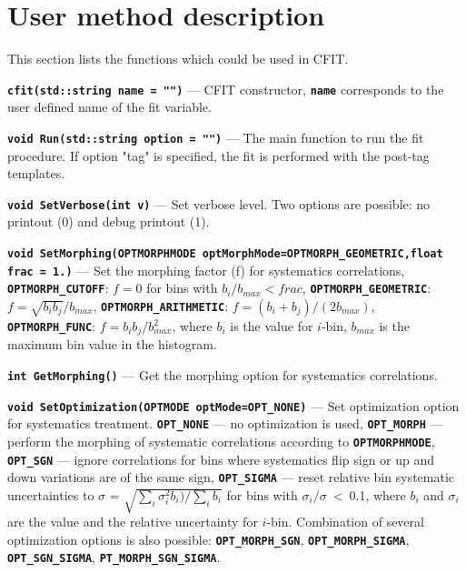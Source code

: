 \documentclass[12pt]{article}
\newcommand\verbbf[1]{\textcolor[rgb]{0,0,1}{\texttt{\textbf{#1}}}}
\newcommand\verbbfb[1]{\textcolor[rgb]{0,0,0}{\texttt{\textbf{#1}}}}
\begin{document}
\section{User method description}

This section lists the functions which could be used in CFIT.

\vspace{0.3cm}

\noindent \verbbf{cfit(std::string name = "")} --- CFIT constructor,
\verbbfb{name} corresponds to the user defined name of the fit variable.

\vspace{0.3cm}

\noindent \verbbf{void Run(std::string option = "")} --- The main function to run the fit
procedure. If option "tag" is specified, the fit is performed with the post-tag templates.

\vspace{0.3cm}

\noindent \verbbf{void SetVerbose(int v)} --- Set verbose level. 
Two options are possible: no printout (0) and debug printout (1).

\vspace{0.3cm}

\noindent \verbbf{void SetMorphing(OPTMORPHMODE optMorphMode=OPTMORPH\_GEOMETRIC,float frac = 1.)} ---
Set the morphing factor (f) for systematics correlations,
\verbbfb{OPTMORPH\_CUTOFF}: $f=0$ for bins with $b_{i}/b_{max} < frac$, 
\verbbfb{OPTMORPH\_GEOMETRIC}: $f=\sqrt{b_{i}b_{j}}/b_{max}$,
\verbbfb{OPTMORPH\_ARITHMETIC}: $f=(b_{i}+b_{j})/(2 b_{max})$,
\verbbfb{OPTMORPH\_FUNC}: $f=b_{i}b_{j}/b_{max}^{2}$, where $b_{i}$ is
the value for $i$-bin, $b_{max}$ is the maximum bin value in the
histogram.

\vspace{0.3cm}

\noindent \verbbf{int GetMorphing()} --- Get the morphing option for
systematics correlations.

\vspace{0.3cm}

\noindent \verbbf{void SetOptimization(OPTMODE optMode=OPT\_NONE)} --- Set
optimization option for systematics treatment. \verbbfb{OPT\_NONE} --- no
optimization is used, \verbbfb{OPT\_MORPH} --- perform the morphing of systematic
correlations according to \verbbfb{OPTMORPHMODE}, \verbbfb{OPT\_SGN} --- ignore
correlations for bins where systematics flip sign or up and down
variations are of the same sign, \verbbfb{OPT\_SIGMA} --- reset
relative bin systematic uncertainties to $\sigma$ =
$\sqrt{\sum\limits_{i}^{}\sigma_{i}^{2}b_{i})/\sum\limits_{i}^{}b_{i}}$
for bins with $\sigma_{i}/\sigma$~<~0.1, where $b_{i}$ and
$\sigma_{i}$ are the value and the relative uncertainty for $i$-bin.
Combination of several optimization options is also possible:
\verbbfb{OPT\_MORPH\_SGN}, \verbbfb{OPT\_MORPH\_SIGMA}, \verbbfb{OPT\_SGN\_SIGMA},
\verbbfb{PT\_MORPH\_SGN\_SIGMA}.
\end{document}

